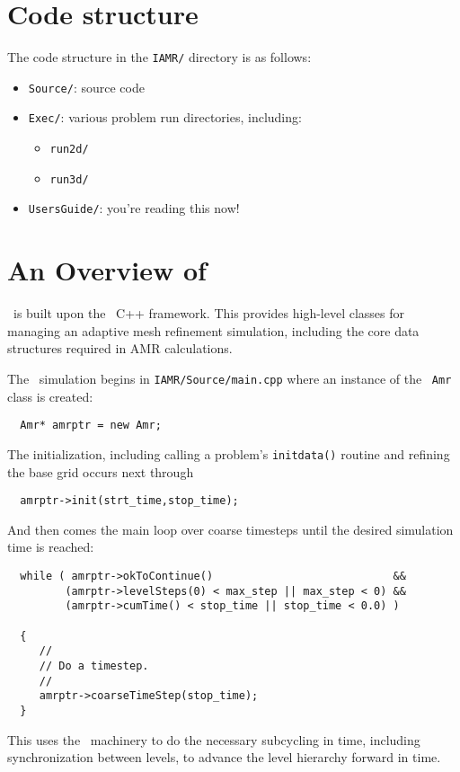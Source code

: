 \section{Code structure}

The code structure in the {\tt IAMR/} directory is as follows:
\begin{itemize}

\item {\tt Source/}: source code

\item {\tt Exec/}: various problem run directories, including:
  \begin{itemize}
  \item {\tt run2d/}
  \item {\tt run3d/}
  \end{itemize}

\item {\tt UsersGuide/}: you're reading this now!

\end{itemize}


\section{An Overview of \iamr}

\iamr\ is built upon the \amrex\ C++ framework.  This provides
high-level classes for managing an adaptive mesh refinement simulation,
including the core data structures required in AMR calculations.

The \iamr\ simulation begins in {\tt IAMR/Source/main.cpp} where an instance
of the \amrex\ {\tt Amr} class is created:
\begin{lstlisting}
  Amr* amrptr = new Amr;
\end{lstlisting}
The initialization, including calling a problem's {\tt initdata()}
routine and refining the base grid occurs next through
\begin{lstlisting}
  amrptr->init(strt_time,stop_time);
\end{lstlisting}
And then comes the main loop over coarse timesteps until the
desired simulation time is reached:
\begin{lstlisting}
  while ( amrptr->okToContinue()                            &&
         (amrptr->levelSteps(0) < max_step || max_step < 0) &&
         (amrptr->cumTime() < stop_time || stop_time < 0.0) )

  {
     //
     // Do a timestep.
     //
     amrptr->coarseTimeStep(stop_time);
  }
\end{lstlisting}
This uses the \amrex\ machinery to do the necessary subcycling in time,
including synchronization between levels, to advance the level hierarchy
forward in time.  

